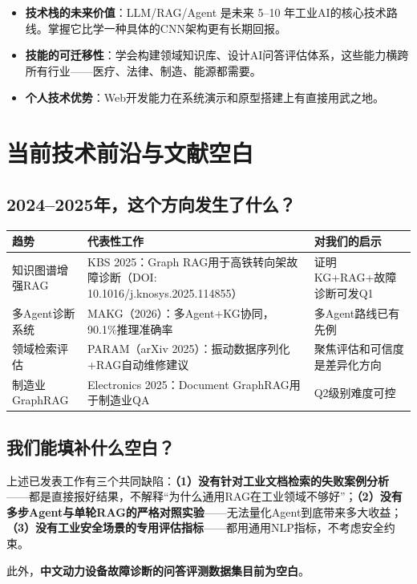 \documentclass[a4paper, 11pt]{ctexart}
\begin{document}
\begin{itemize}
    \item \textbf{技术栈的未来价值}：LLM/RAG/Agent 是未来 5--10 年工业AI的核心技术路线。掌握它比学一种具体的CNN架构更有长期回报。
    \item \textbf{技能的可迁移性}：学会构建领域知识库、设计AI问答评估体系，这些能力横跨所有行业——医疗、法律、制造、能源都需要。
    \item \textbf{个人技术优势}：Web开发能力在系统演示和原型搭建上有直接用武之地。
\end{itemize}


\section{当前技术前沿与文献空白}

\subsection{2024--2025年，这个方向发生了什么？}

\begin{table}[H]
\centering
\renewcommand{\arraystretch}{1.2}
\small
\begin{tabular}{p{3.5cm} p{5cm} p{4.5cm}}
    \toprule
    \textbf{趋势} & \textbf{代表性工作} & \textbf{对我们的启示} \\
    \midrule
    知识图谱增强RAG & KBS 2025：Graph RAG用于高铁转向架故障诊断（DOI: 10.1016/j.knosys.2025.114855） & 证明KG+RAG+故障诊断可发Q1 \\
    多Agent诊断系统 & MAKG（2026）：多Agent+KG协同，90.1\%推理准确率 & 多Agent路线已有先例 \\
    领域检索评估 & PARAM（arXiv 2025）：振动数据序列化+RAG自动维修建议 & 聚焦评估和可信度是差异化方向 \\
    制造业GraphRAG & Electronics 2025：Document GraphRAG用于制造业QA & Q2级别难度可控 \\
    \bottomrule
\end{tabular}
\end{table}

\subsection{我们能填补什么空白？}

\begin{tcolorbox}[colback=bglight, colframe=tsinghua!30, arc=2mm]
上述已发表工作有三个共同缺陷：\textbf{（1）没有针对工业文档检索的失败案例分析}——都是直接报好结果，不解释``为什么通用RAG在工业领域不够好''；\textbf{（2）没有多步Agent与单轮RAG的严格对照实验}——无法量化Agent到底带来多大收益；\textbf{（3）没有工业安全场景的专用评估指标}——都用通用NLP指标，不考虑安全约束。

此外，\textbf{中文动力设备故障诊断的问答评测数据集目前为空白}。
\end{tcolorbox}
\end{document}
